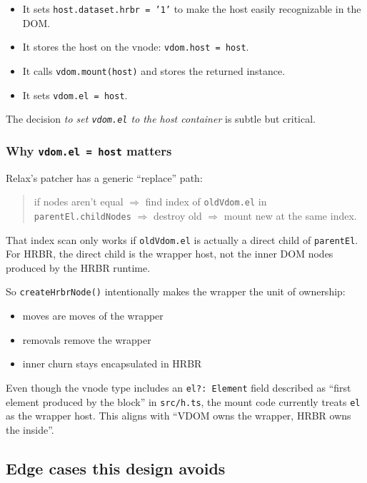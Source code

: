\begin{itemize}
\item It sets \texttt{host.dataset.hrbr = '1'} to make the host easily recognizable in the DOM.
\item It stores the host on the vnode: \texttt{vdom.host = host}.
\item It calls \texttt{vdom.mount(host)} and stores the returned instance.
\item It sets \texttt{vdom.el = host}.
\end{itemize}

The decision \emph{to set \texttt{vdom.el} to the host container} is subtle but critical.

\subsubsection{Why \texttt{vdom.el = host} matters}

Relax's patcher has a generic ``replace'' path:

\begin{quote}
if nodes aren't equal $\Rightarrow$ find index of \texttt{oldVdom.el} in \texttt{parentEl.childNodes} $\Rightarrow$ destroy old $\Rightarrow$ mount new at the same index.
\end{quote}

That index scan only works if \texttt{oldVdom.el} is actually a direct child of \texttt{parentEl}. For HRBR, the direct child is the wrapper host, not the inner DOM nodes produced by the HRBR runtime.

So \texttt{createHrbrNode()} intentionally makes the wrapper the unit of ownership:

\begin{itemize}
\item moves are moves of the wrapper
\item removals remove the wrapper
\item inner churn stays encapsulated in HRBR
\end{itemize}

Even though the vnode type includes an \texttt{el?: Element} field described as ``first element produced by the block'' in \texttt{src/h.ts}, the mount code currently treats \texttt{el} as the wrapper host. This aligns with ``VDOM owns the wrapper, HRBR owns the inside''.

\subsection{Edge cases this design avoids}

